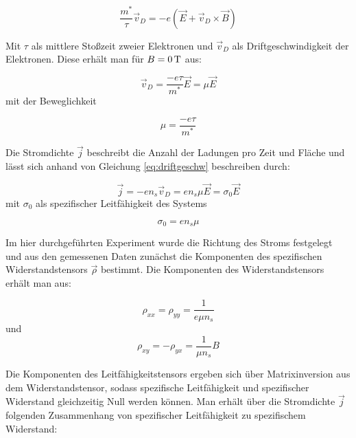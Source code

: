 \begin{equation}
\frac{m^*}{\tau} \vec{v}_D = -e(\vec{E}+\vec{v}_D \times \vec{B})
\label{eq:beweggl_stat}
\end{equation}

Mit $\tau$ als mittlere Stoßzeit zweier Elektronen und $\vec{v}_D$ als Driftgeschwindigkeit der Elektronen. Diese erhält man für $B=\unit[0]{T}$ aus:

\begin{equation}
\vec{v}_D=\frac{-e\tau}{m^*}\vec{E}=\mu\vec{E}
\label{eq:driftgeschw}
\end{equation}
mit der Beweglichkeit

\begin{equation}
\mu=\frac{-e\tau}{m^*}
\label{eq:bewegl_def}
\end{equation}

Die Stromdichte $\vec{j}$ beschreibt die Anzahl der Ladungen pro Zeit und Fläche und lässt sich anhand von Gleichung \ref{eq:driftgeschw} beschreiben durch:

\begin{equation}
\vec{j}=-en_s\vec{v}_D=en_s\mu\vec{E}=\sigma_0\vec{E}
\label{eq:stromdichte_herleitung}
\end{equation}
mit $\sigma_0$ als spezifischer Leitfähigkeit des Systems

\begin{equation}
\sigma_0=en_s\mu
\label{eq:sigma_def}
\end{equation}

Im hier durchgeführten Experiment wurde die Richtung des Stroms festgelegt und aus den gemessenen Daten zunächst die Komponenten des spezifischen Widerstandstensors $\vec{\rho}$ bestimmt. 
Die Komponenten des Widerstandstensors erhält man aus:

\begin{equation}
\rho_{xx}=\rho_{yy}=\frac{1}{e\mu n_s}
\label{eq:widerst_tensor_xx_yy}
\end{equation}
und
\begin{equation}
\rho_{xy}=-\rho_{yx}=\frac{1}{\mu n_s}B
\label{eq:widerst_tensor_xy_yx}
\end{equation}

Die Komponenten des Leitfähigkeitstensors ergeben sich über Matrixinversion aus dem Widerstandstensor, sodass spezifische Leitfähigkeit und spezifischer Widerstand gleichzeitig Null werden können. Man erhält über die Stromdichte $\vec{j}$ folgenden Zusammenhang von spezifischer Leitfähigkeit zu spezifischem Widerstand:

